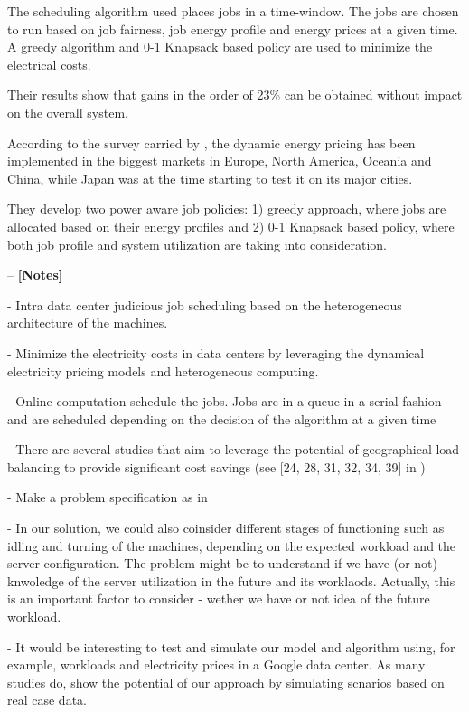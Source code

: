 The scheduling algorithm used places jobs in a time-window. The jobs are chosen
to run based on job fairness, job energy profile and energy prices at a given
time. A greedy algorithm and 0-1 Knapsack based policy are used to minimize the
electrical costs.

Their results show that gains in the order of 23\% can be obtained without
impact on the overall system. 

According to the survey carried by \cite{DYN_PRICING_HPC}, the dynamic energy
pricing has been implemented in the biggest markets in Europe, North America,
Oceania and China, while Japan was at the time starting to test it on its major
cities.

They develop two power aware job policies: 1) greedy approach, where jobs are
allocated based on their energy profiles  and 2) 0-1 Knapsack based policy,
where both job profile and system utilization are taking into consideration.



 

--
\textbf{[Notes]}

- Intra data center judicious job scheduling based on the heterogeneous
architecture of the machines.

- Minimize the electricity costs in data centers by leveraging the dynamical 
  electricity pricing models and heterogeneous computing.

- Online computation schedule the jobs. Jobs are in a queue in a serial fashion
  and are scheduled depending on the decision of the algorithm at a given time

- There are several studies that aim to leverage the potential of geographical 
  load balancing to provide significant cost savings (see [24, 28, 31, 32, 34,
  39] in \cite{GREENING})

- Make a problem specification as in \cite{CUTTING_BILL}

- In our solution, we could also coinsider different stages of functioning such
  as idling and turning of the machines, depending on the expected workload and
  the server configuration. The problem might be to understand if we have (or
  not) knwoledge of the server utilization in the future and its worklaods.
  Actually, this is an important factor to consider - wether we have or not idea
  of the future workload.  

- It would be interesting to test and simulate our model and algorithm using,
  for example, workloads and electricity prices in a Google data center. As many
  studies do, show the potential of our approach by simulating scnarios based on
  real case data. 

